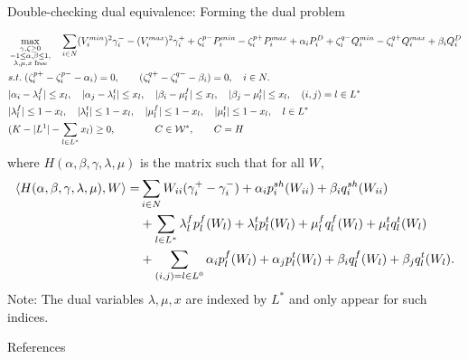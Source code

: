 \documentclass[xcolor=dvipsnames]{beamer}
\newcommand{\ii}{i}
\newcommand{\llll}{l}
\newcommand{\WW}{W}
\newcommand{\WSet}{\mathcal{W}}
\begin{document}
\begin{frame}{Double-checking dual equivalence: Forming the dual problem}
\begin{tiny}
\begin{subequations}
\begin{align}
& \max_{\substack{\gamma,\zeta \ge 0\\-1\le \alpha,\beta \le 1,\\ \lambda,\mu,x\; \text{free}}} \quad 
 \sum_{\ii \in N}  (V_\ii^{min})^2 \gamma_\ii^- - (V_\ii^{max})^2 \gamma_\ii^+ + \zeta_\ii^{p-}P_\ii^{min} - \zeta_\ii^{p+}P_\ii^{max} +\alpha_\ii P_\ii^D 
+ \zeta_\ii^{q-}Q_\ii^{min} - \zeta_\ii^{q+}Q_\ii^{max} + \beta_\ii Q_\ii^D \notag \\
&s.t.\; (\zeta_\ii^{p+}-\zeta_\ii^{p-} - \alpha_\ii) = 0, \qquad (\zeta_\ii^{q+}-\zeta_\ii^{q-} - \beta_\ii) = 0,\quad \ii \in N. \notag \\
& | \alpha_i -\lambda_\llll^f| \le x_l,\quad| \alpha_j - \lambda_l^t| \le x_l,\quad |\beta_i - \mu_l^f | \le x_l,\quad|\beta_j - \mu_l^t| \le x_l,\quad (i,j)=l \in L^* \notag \\
& |\lambda_l^f| \le 1-x_l,\quad |\lambda_l^t| \le 1-x_l,\quad|\mu_l^f| \le 1-x_l,\quad |\mu_l^t| \le 1-x_l,\quad l \in L^* \notag \\
& (K-|L^1|-\sum_{l \in L^*} x_l) \ge 0, \qquad\qquad C \in \WSet^* \notag, \qquad C=H\\
\end{align}
\end{subequations}
where $H(\alpha,\beta,\gamma,\lambda,\mu)$ is the matrix such that for all $\WW$, 
\begin{align*}
\langle H(\alpha,\beta,\gamma,\lambda,\mu), W \rangle = &\sum_{\ii \in N} W_{\ii\ii}(\gamma_\ii^+-\gamma_\ii^-) + \alpha_\ii p_\ii^{sh}(\WW_{ii}) + \beta_\ii q_\ii^{sh}(\WW_{ii}) \\
&+ \sum_{l \in L^*} \lambda_l^f p_l^f(\WW_l) + \lambda_l^t p_l^t(\WW_l) + \mu_l^f q_l^f(\WW_l) + \mu_l^t q_l^t(\WW_l) \notag \\
&+ \sum_{(i,j)=l \in L^0} \alpha_i p_l^f(\WW_l) + \alpha_j p_l^t(\WW_l) + \beta_i q_l^f(\WW_l) + \beta_j q_l^t(\WW_l).
\end{align*}
Note: The dual variables $\lambda,\mu,x$ are indexed by $L^*$ and only appear for such indices.
\end{tiny}
\end{frame}




 


\begin{frame}[allowframebreaks]{References} 

 
%



\end{frame}
      
\end{document}
